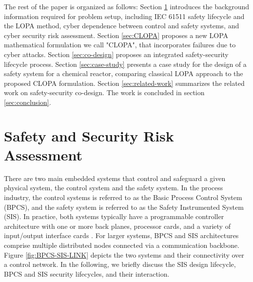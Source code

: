 \documentclass[journal]{IEEEtran}
\begin{document}
The rest of the paper is organized as follows: Section \ref{sec:safety-security-risk-assessment} introduces the background information required for problem setup, including IEC 61511 safety lifecycle and the LOPA method, cyber dependence between control and safety systems, and cyber security risk assessment. Section \ref{sec:CLOPA} proposes a new LOPA mathematical formulation we call "CLOPA", that incorporates failures due to cyber attacks. Section \ref{sec:co-design} proposes an integrated safety-security lifecycle process. Section \ref{sec:case-study} presents a case study for the design of a safety system for a chemical reactor, comparing classical LOPA approach to the proposed CLOPA formulation. Section \ref{sec:related-work} summarizes the related work on safety-security co-design. The work is concluded in section \ref{sec:conclusion}.

\section{Safety and Security Risk Assessment} \label{sec:safety-security-risk-assessment}
There are two main embedded systems that control and safeguard a given physical system, the control system and the safety system. In the process industry, the control systems is referred to as the Basic Process Control System (BPCS), and the safety system is referred to as the Safety Instrumented System (SIS). In practice, both systems typically have a programmable controller architecture with one or more back planes, processor cards, and a variety of input/output interface cards \cite{Gruhn2006}. For larger systems, BPCS and SIS architectures comprise multiple distributed nodes connected via a communication backbone. Figure \ref{fig:BPCS-SIS-LINK} depicts the two systems and their connectivity over a control network. In the following, we briefly discuss the SIS design lifecycle, BPCS and SIS security lifecycles, and their interaction.
\end{document}
